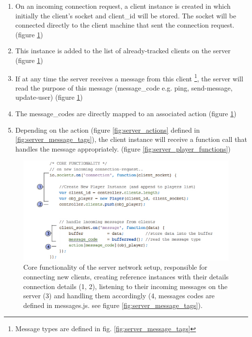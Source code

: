 \documentclass[bsc,frontabs,twoside,singlespacing,parskip,deptreport]{infthesis}     %
\begin{document}
\begin{enumerate}
\item On an incoming connection request, a client instance is created in which initially the client's socket and client\_id will be stored. The socket will be connected directly to the client machine that sent the connection request. (figure \ref{fig:server_core})
\item This instance is added to the list of already-tracked clients on the server (figure \ref{fig:server_core})
\item If at any time the server receives a message from this client \footnote{Message types are defined in fig. \ref{fig:server_message_tags}}, the server will read the purpose of this message (message\_code e.g. ping, send-message, update-user) (figure \ref{fig:server_core})
\item The message\_codes are directly mapped to an associated action (figure \ref{fig:server_core})
\item Depending on the action (figure \ref{fig:server_actions} defined in \ref{fig:server_message_tags}), the client instance will receive a function call that handles the message appropriately. (figure \ref{fig:server_player_functions})
\end{enumerate}

\begin{figure}[H]
\includegraphics[scale=0.60]{images/server_code.jpg}
\caption{Core functionality of the server network setup, responsible for connecting new clients, creating reference instances with their details connection details (1, 2), listening to their incoming messages on the server (3) and handling them accordingly (4, messages codes are defined in messages.js. see figure \ref{fig:server_message_tags}). }
\label{fig:server_core}
\vspace{1em}
\end{figure}
\end{document}
